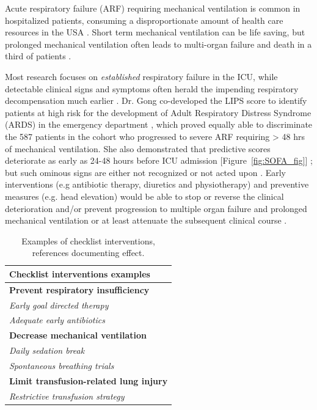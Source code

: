 \documentclass[11pt,notitlepage]{article}
\begin{document}
Acute respiratory failure (ARF) requiring mechanical ventilation is common in hospitalized patients, consuming a disproportionate amount of health care resources in the USA \cite{Wunsch_20639743}. Short term mechanical ventilation can be life saving, but prolonged mechanical ventilation often leads to multi-organ failure and death in a third of patients \cite{Wunsch_20639743, Ranieri_10872010}.

Most research focuses on \textit{established} respiratory failure in the ICU, while detectable clinical signs and symptoms often herald the impending respiratory decompensation much earlier \cite{Rohde_23401431}. Dr. Gong co-developed the LIPS score to identify patients at high risk for the development of Adult Respiratory Distress Syndrome (ARDS) in the emergency department \cite{Herridge_12594312}, which proved equally able to discriminate the 587 patients in the cohort who progressed to severe ARF requiring > 48 hrs of mechanical ventilation. She also demonstrated that predictive scores deteriorate as early as 24-48 hours before ICU admission  [Figure~\ref{fig:SOFA_fig}] \cite{Yu_24970344}; but such ominous signs are either not recognized or not acted upon \cite{Hillman_12415452,McQuillan_9632403}. Early interventions (e.g antibiotic therapy, diuretics and physiotherapy) and preventive measures (e.g. head elevation) would be able to stop or reverse the clinical deterioration and/or prevent progression to multiple organ failure and prolonged mechanical ventilation or at least attenuate the subsequent clinical course \cite{Naeem_16150531,Rivers_11794169,Rivers_12594312,Mitchell_20378235}. 

\begin{table} 
\vspace{-25pt}
\begin{center}
\begin{tabular}{l}
\toprule
\multicolumn{1}{l}{\footnotesize Checklist interventions examples}\\
\midrule
\footnotesize \textbf{Prevent respiratory insufficiency}\\
\footnotesize \emph{Early goal directed therapy \cite{Levy_23103175}}\\
\footnotesize \emph{Adequate early antibiotics \cite{Lim_19783532}}\\
\footnotesize \textbf{Decrease mechanical ventilation} \\
\footnotesize \emph{Daily sedation break \cite{Barr_23269131}} \\ 
\footnotesize \emph{Spontaneous breathing trials \cite{Girard_18191684}}\\  
\footnotesize \textbf{Limit transfusion-related lung injury}\\
\footnotesize \emph{Restrictive transfusion strategy \cite{Hebert_9971864}}\\
\hline
\end{tabular}\\
\end{center}
\vspace{-20pt}
\caption{\footnotesize Examples of checklist interventions, references documenting effect.} \label{table:Checklist}
\vspace{-10pt}
\end{table} 
\end{document}
